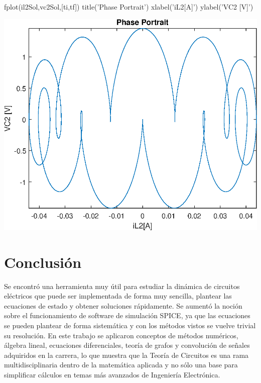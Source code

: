 \documentclass[10pt,a4paper]{article} %
\begin{document}
\begin{matlabcode}
	fplot(il2Sol,vc2Sol,[ti,tf])
	title('Phase Portrait')
	xlabel('iL2[A]')
	ylabel('VC2 [V]')
\end{matlabcode}
\begin{center}
	\includegraphics[width=\maxwidth{56.196688409433015em}]{figure_3_10}
\end{center}
\newpage
	\section{Conclusión}
	Se encontró una herramienta muy útil para estudiar la dinámica de circuitos eléctricos que puede ser implementada de forma muy sencilla, plantear las ecuaciones de estado y obtener soluciones rápidamente. Se aumentó la noción sobre el funcionamiento de software de simulación SPICE, ya que las ecuaciones se pueden plantear de forma sistemática y con los métodos vistos se vuelve trivial su resolución. En este trabajo se aplicaron conceptos de métodos numéricos, álgebra lineal, ecuaciones diferenciales, teoría de grafos y convolución de señales adquiridos en la carrera, lo que muestra que la Teoría de Circuitos es una rama multidisciplinaria dentro de la matemática aplicada y no sólo una base para simplificar cálculos en temas más avanzados de Ingeniería Electrónica.
	
\end{document}
